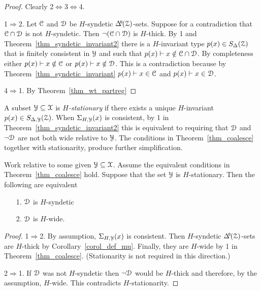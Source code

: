 \begin{proof}
  Clearly 2$\Leftrightarrow$3$\Leftrightarrow$4.

  1$\Rightarrow$2.
  Let $\EuScript C$ and $\EuScript D$ be $H$-syndetic $\BDelta({\Z})$-sets.
  Suppose for a contradiction that $\EuScript C\cap\EuScript D$ is not $H$-syndetic.
  Then $\neg(\EuScript C\cap\EuScript D)$ is $H$-thick.
  By 1 and Theorem~\ref{thm_syndetic_invariant2} there is a $H$-invariant type $p(x)\in S_\Delta(\EuScript Z)$ that is finitely consistent in $\EuScript Y$ and such that $p(x)\vdash x\notin\EuScript C\cap\EuScript D$.
  By completeness either $p(x)\vdash x\notin\EuScript C$ or $p(x)\vdash x\notin\EuScript D$.
  This is a contradiction because by Theorem~\ref{thm_syndetic_invariant} $p(x)\vdash x\in\EuScript C$ and $p(x)\vdash x\in\EuScript D$.


  4$\Rightarrow$1. By Theorem~\ref{thm_wt_partreg}
\end{proof}


A subset $\EuScript Y\subseteq\EuScript X$ is \emph{$H$-stationary\/} if there exists a unique $H$-invariant $p(x)\in S_{\Delta,\EuScript Y}(\EuScript Z)$.
When $\Sigma_{H,\EuScript Y}(x)$ is consistent, by 1 in Theorem~\ref{thm_syndetic_invariant2} this is equivalent to requiring that $\EuScript D$ and $\neg\EuScript D$ are not both wide relative to $\EuScript Y$.
The conditions in Theorem~\ref{thm_coalesce} together with stationarity, produce further simplification.

\begin{fact}\label{fact_starionarity_thick_syndetic}
  Work relative to some given $\EuScript Y\subseteq\EuScript X$.
  Assume the equivalent conditions in Theorem~\ref{thm_coalesce} hold.
  Suppose that the set $\EuScript Y$ is $H$-stationary.
  Then the following are equivalent
  \begin{itemize}
    \item [1.] $\EuScript D$ is $H$-syndetic
    \item [2.] $\EuScript D$ is $H$-wide.
  \end{itemize}\smallskip
\end{fact}

\begin{proof}
  1$\Rightarrow$2.
  By assumption, $\Sigma_{H,\EuScript Y}(x)$ is consistent.
  Then $H$-syndetic $\BDelta({\Z})$-sets are $H$-thick by Corollary~\ref{corol_def_mu}.
  Finally, they are  $H$-wide by 1 in Theorem~\ref{thm_coalesce}.
  (Stationarity is not required in this direction.)

  2$\Rightarrow$1.
  If $\EuScript D$ was not $H$-syndetic then $\neg\EuScript D$ would be $H$-thick and therefore, by the assumption, $H$-wide.
  This contradicts $H$-stationarity.
\end{proof}

